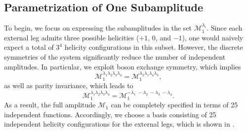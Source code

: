 \subsection{Parametrization of One Subamplitude}

To begin, we focus on expressing the subamplitudes in the set ${\mathcal{M}_1^{\lambda_i}}$. Since each external leg admits three possible helicities ($+1$, $0$, and $-1$), one would naively expect a total of $3^4$ helicity configurations in this subset. However, the discrete symmetries of the system significantly reduce the number of independent amplitudes.
In particular, we exploit boson exchange symmetry, which implies
\begin{equation}
\mathcal{M}_1^{\lambda_1 \lambda_2 \lambda_3 \lambda_4}
=
\mathcal{M}_1^{\lambda_2 \lambda_1 \lambda_4 \lambda_3},
\end{equation}
as well as parity invariance, which leads to
\begin{equation}
\mathcal{M}_1^{\lambda_1 \lambda_2 \lambda_3 \lambda_4}
=
\mathcal{M}_1^{-\lambda_1 \; -\lambda_2 \; -\lambda_3 \; -\lambda_4}.
\end{equation}
As a result, the full amplitude $\mathcal{M}_1$ can be completely specified in terms of 25 independent functions. Accordingly, we choose a basis consisting of 25 independent helicity configurations for the external legs, which is shown in .

